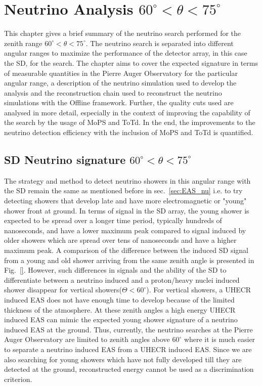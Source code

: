 
\chapter{Neutrino Analysis \texorpdfstring{$60^\circ < \theta < 75^\circ$}{}}
\label{chap:DGL}
This chapter gives a brief summary of the neutrino search performed for the zenith range $60^\circ < \theta < 75^\circ$. The neutrino search is separated into different angular ranges to maximize the performance of the detector array, in this case the SD, for the search. The chapter aims to cover the expected signature in terms of measurable quantities in the Pierre Auger Observatory for the particular angular range, a description of the neutrino simulation used to develop the analysis and the reconstruction chain used to reconstruct the neutrino simulations with the Offline framework. Further, the quality cuts used are analysed in more detail, especially in the context of improving the capability of the search by the usage of MoPS and ToTd. In the end, the improvements to the neutrino detection efficiency with the inclusion of MoPS and ToTd is quantified.


\section{SD Neutrino signature \texorpdfstring{$60^{\circ} < \theta < 75^{\circ}$}{}}
\label{sec:sig_DGL}

The strategy and method to detect neutrino showers in this angular range with the SD remain the same as mentioned before in sec.~\ref{sec:EAS_nu} i.e. to try detecting showers that develop late and have more electromagnetic or "young" shower front at ground. In terms of signal in the SD array, the young shower is expected to be spread over a longer time period, typically hundreds of nanoseconds, and have a lower maximum peak compared to signal induced by older showers which are spread over tens of nanoseconds and have a higher maximum peak. A comparison of the difference between the induced SD signal from a young and old shower arriving from the same zenith angle is presented in Fig.~\ref{}. However, such differences in signals and the ability of the SD to differentiate between a neutrino induced and a proton/heavy nuclei induced shower disappear for vertical showers($\Theta < 60^{\circ}$). For vertical showers, a UHECR induced EAS does not have enough time to develop because of the limited thickness of the atmosphere. At these zenith angles a high energy UHECR induced EAS can mimic the expected young shower signature of a neutrino induced EAS at the ground. Thus, currently, the neutrino searches at the Pierre Auger Observatory are limited to zenith angles above $60^\circ$ where it is much easier to separate a neutrino induced EAS from a UHECR induced EAS. Since we are also searching for young showers which have not fully developed till they are detected at the ground, reconstructed energy cannot be used as a discrimination criterion.


